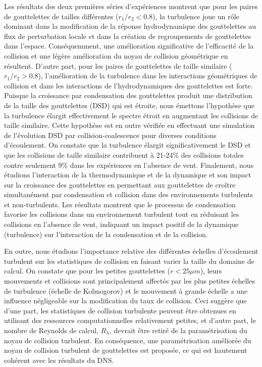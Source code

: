 \documentclass [12pt,letterpaper]{report}
\begin{document}
Les r\'esultats des deux premi\`eres s\'eries d'exp\'eriences montrent que pour les paires de gouttelettes de tailles diff\'erentes ($ r_1/r_2<0.8$), la turbulence joue un r\^ole dominant dans la modification de la r\'eponse hydrodynamique des gouttelettes au flux de perturbation locale et dans la cr\'eation de regroupements de gouttelettes dans l'espace. Cons\'equemment, une am\'elioration significative de l'efficacit\'e de la collision et une l\'eg\`ere am\'elioration du noyau de collision g\'eom\'etrique en r\'esultent. D'autre part, pour les paires de gouttelettes de taille similaire ($r_1/r_2>0.8 $), l'am\'elioration de la turbulence dans les interactions g\'eom\'etriques de collision et dans les interactions de l'hydrodynamiques des gouttelettes est forte. Puisque la croissance par condensation des gouttelettes produit une distribution de la taille des gouttelettes (DSD) qui est \'etroite, nous \'emettons l'hypoth\`ese que la turbulence \'elargit effectivement le spectre \'etroit en augmentant les collisions de taille similaire. Cette hypoth\`ese est en outre v\'erifi\'ee en effectuant une simulation de l'\'evolution DSD par collision-coalescence pour diverses conditions d'\'ecoulement. On constate que la turbulence \'elargit significativement le DSD et que les collisions de taille similaire contribuent \`a 21-24\% des collisions totales contre seulement 9\% dans les exp\'eriences en l'absence de vent. Finalement, nous \'etudions l'interaction de la thermodynamique et de la dynamique et son impact sur la croissance des gouttelettes en permettant aux gouttelettes de croître simultan\'ement par condensation et collision dans des environnements turbulents et non-turbulents. Les r\'esultats montrent que le processus de condensation favorise les collisions dans un environnement turbulent tout en r\'eduisant les collisions en l’absence de vent, indiquant un impact positif de la dynamique (turbulence) sur l'interaction de la condensation et de la collision.

En outre, nous \'etudions l'importance relative des diff\'erentes \'echelles d'\'ecoulement turbulent sur les statistiques de collision en faisant varier la taille du domaine de calcul. On constate que pour les petites gouttelettes ($r<25\mu m$), leurs mouvements et collisions sont principalement affect\'es par les plus petites \'echelles de turbulence (\'echelle de Kolmogorov) et le mouvement \`a grande \'echelle a une influence n\'egligeable sur la modification du taux de collision. Ceci sugg\`ere que d'une part, les statistiques de collision turbulente peuvent \^etre obtenues en utilisant des ressources computationnelles relativement petites, et d'autre part, le nombre de Reynolds de calcul, $R_\lambda $, devrait \^etre retir\'e de la param\'etrisation du noyau de collision turbulent. En cons\'equence, une param\'etrisation am\'elior\'ee du noyau de collision turbulent de gouttelettes est propos\'ee, ce qui est hautement coh\'erent avec les r\'esultats du DNS.
\end{document}
